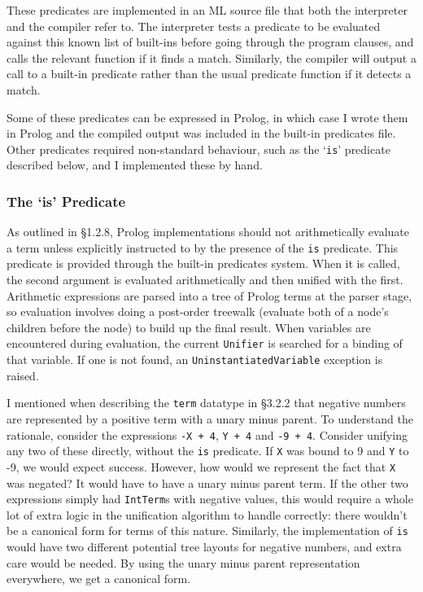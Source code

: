 \documentclass[12pt]{article}
\begin{document}
These predicates are implemented in an ML source file that both the interpreter and the compiler refer to.
The interpreter tests a predicate to be evaluated against this known list of built-ins before going through the program clauses, and calls the relevant function if it finds a match. 
Similarly, the compiler will output a call to a built-in predicate rather than the usual predicate function if it detects a match.

Some of these predicates can be expressed in Prolog, in which case I wrote them in Prolog and the compiled output was included in the built-in predicates file. Other predicates required non-standard behaviour, such as the `\verb|is|' predicate described below, and I implemented these by hand.

\subsubsection{The `is' Predicate}

As outlined in \S1.2.8, Prolog implementations should not arithmetically evaluate a term unless explicitly instructed to by the presence of the \verb|is| predicate.
This predicate is provided through the built-in predicates system.
When it is called, the second argument is evaluated arithmetically and then unified with the first.
Arithmetic expressions are parsed into a tree of Prolog terms at the parser stage, so evaluation involves doing a post-order treewalk (evaluate both of a node's children before the node) to build up the final result.
When variables are encountered during evaluation, the current \verb|Unifier| is searched for a binding of that variable.
If one is not found, an \verb|UninstantiatedVariable| exception is raised. 

I mentioned when describing the \verb|term| datatype in \S3.2.2 that negative numbers are represented by a positive term with a unary minus parent.
To understand the rationale, consider the expressions \verb|-X + 4|, \verb|Y + 4| and \verb|-9 + 4|. 
Consider unifying any two of these directly, without the \verb|is| predicate. 
If \verb|X| was bound to 9 and \verb|Y| to -9, we would expect success. 
However, how would we represent the fact that \verb|X| was negated?
It would have to have a unary minus parent term.
If the other two expressions simply had \verb|IntTerm|s with negative values, this would require a whole lot of extra logic in the unification algorithm to handle correctly: there wouldn't be a canonical form for terms of this nature.
Similarly, the implementation of \verb|is| would have two different potential tree layouts for negative numbers, and extra care would be needed.
By using the unary minus parent representation everywhere, we get a canonical form.
\end{document}
